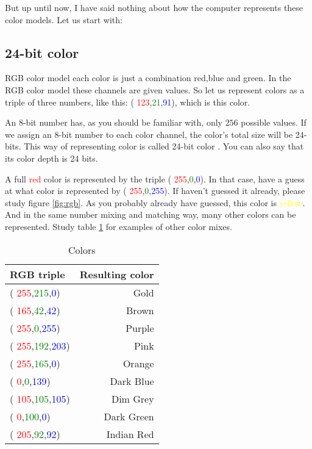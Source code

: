 \begin{refsection}
  \newcommand{\rgbtrip}[3]{( \textcolor{red}{#1},\textcolor{green}{#2},\textcolor{blue}{#3})}

  But up until now, I have said nothing about how the computer
  represents these color models. Let us start with:

  \subsection{24-bit color}
  \label{sec:24-bit-color}

  RGB color model each color is just a combination red,blue and
  green. In the RGB color model these channels are given values. So let
  us represent colors as a triple of three numbers, like this:
  \rgbtrip{123}{21}{91}, which is \textcolor[RGB]{123,21,91}{this color}.

  An 8-bit number has, as you should be familiar with, only $256$ possible values. If we
  assign an  8-bit number to each color channel, the color's total size
  will be 24-bits. This way of representing color is called 24-bit color
  . You can also say that its color depth  is 24 bits.

  \newcommand{\selfcolor}[1]{\textcolor{#1}{#1}}

  A full \selfcolor{red} color is represented by the triple \rgbtrip{255}{0}{0}. In
  that case, have a guess at what color is represented by
  \rgbtrip{255}{0}{255}. If haven't guessed it already, please study
  figure \ref{fig:rgb}. As you probably already have guessed, this color
  is \selfcolor{yellow}. And in the same number mixing and matching way, many other
  colors can be represented. Study table \ref{tab:color-examples} for
  examples of other color mixes.



  \begin{table}[h!]
    \newcommand{\colorrow}[4]{  \rgbtrip{#1}{#2}{#3} &
      \textcolor[RGB]{#1,#2,#3}{#4} \\}
    \centering
    \begin{tabular}[h!]{lr}
      \toprule
      RGB triple & Resulting color \\
      \midrule
      \colorrow{255}{215}{0}{Gold}
      \colorrow{165}{42}{42}{Brown}
      \colorrow{255}{0}{255}{Purple}
      \colorrow{255}{192}{203}{Pink}
      \colorrow{255}{165}{0}{Orange}
      \colorrow{0}{0}{139}{Dark Blue}
      \colorrow{105}{105}{105}{Dim Grey}
      \colorrow{0}{100}{0}{Dark Green}
      \colorrow{205}{92}{92}{Indian Red}
      \bottomrule
    \end{tabular}
    \caption{Colors}
    \label{tab:color-examples}
  \end{table}


\end{refsection}
